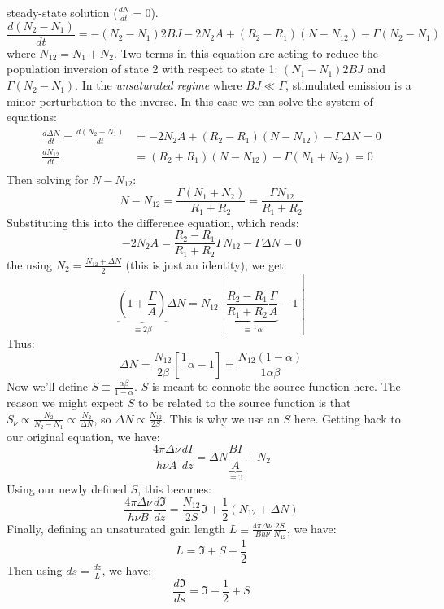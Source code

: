 \documentclass{article}
\def\inv#1{\frac1{#1}}
\def\hf{\frac12}
\def\inv#1{{\frac{1}{}#1}}
\def\hf{\frac12}
\begin{document}
steady-state solution ($\frac{dN}{dt}=0$).
$$\frac{d(N_2-N_1)}{ dt}=-(N_2-N_1)2BJ-2N_2A+(R_2-R_1)(N-N_{12})-\Gamma(N_2-N_1)$$
where $N_{12}=N_1+N_2$.
Two terms in this equation are acting to reduce the population inversion of
state 2 with respect to state 1: $(N_1-N_1)2BJ$ and $\Gamma(N_2-N_1)$.  In the
{\it unsaturated regime} where $BJ\ll\Gamma$, stimulated emission is a minor
perturbation to the inverse.  In this case we can solve the system of equations:
$$\begin{aligned}\frac{d\Delta N}{dt}=\frac{d(N_2-N_1)}{ dt}&=-2N_2A+(R_2-R_1)(N-N_{12})
-\Gamma\Delta N=0\\ 
\frac{dN_{12}}{ dt}&=(R_2+R_1)(N-N_{12})-\Gamma(N_1+N_2)=0\\ \end{aligned}$$
Then solving for $N-N_{12}$:
$$N-N_{12}=\frac{\Gamma(N_1+N_2)}{ R_1+R_2}=\frac{\Gamma N_{12}}{ R_1+R_2}$$
Substituting this into the difference equation, which reads:
$$-2N_2A=\frac{R_2-R_1}{ R_1+R_2}\Gamma N_{12}-\Gamma\Delta N=0$$
the using $N_2=\frac{N_{12}+\Delta N}{2}$ (this is just an identity), we get:
$$\underbrace{\left(1+\frac{\Gamma}{ A}\right)}_{\equiv2\beta}\Delta N
=N_{12}\left[\underbrace{\frac{R_2-R_1}{ R_1+R_2}\frac{\Gamma}{ A}}_{\equiv
\inv{\alpha}}-1\right]$$
Thus:
$$\Delta N=\frac{N_{12}}{2\beta}\left[\inv{\alpha}-1\right]=\frac{N_{12}(1-\alpha)}{
1\alpha\beta}$$
Now we'll define $S\equiv\frac{\alpha\beta}{1-\alpha}$.  $S$ is meant to connote
the source function here.  The reason we might expect $S$ to be related to
the source function is that $S_\nu\propto\frac{N_2}{N_2-N_1}\propto\frac{N_2}{
\Delta N}$, so $\Delta N\propto \frac{N_{12}}{2S}$.  This is why we use an $S$
here.  Getting back to our original equation, we have:
$$\frac{4\pi\Delta\nu}{ h\nu A}\frac{dI}{dz}=\Delta N\underbrace{\frac{BI}{A}}_{
\equiv\mathfrak{I}}+N_2$$
Using our newly defined $S$, this becomes:
$$\frac{4\pi\Delta\nu}{ h\nu B}\frac{d\mathfrak{I}}{dz}=\frac{N_{12}}{2S}\mathfrak{I}+
\hf(N_{12}+\Delta N)$$
Finally, defining an unsaturated gain length $L\equiv\frac{4\pi\Delta\nu}{ Bh\nu}
\frac{2S}{N_{12}}$, we have:
$$L=\mathfrak{I}+S+\hf$$
Then using $ds=\frac{dz}{ L}$, we have:
$$\frac{d\mathfrak{I}}{ds}=\mathfrak{I}+\hf+S$$
\end{document}
